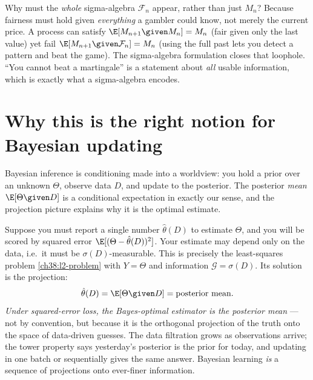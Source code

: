 \begin{happeningbox}
Why must the \emph{whole} sigma-algebra $\mathcal{F}_n$ appear, rather than just $M_n$? Because
fairness must hold given \emph{everything} a gambler could know, not merely the current price.
A process can satisfy $\E[M_{n+1}\given M_n] = M_n$ (fair given only the last value) yet fail
$\E[M_{n+1}\given\mathcal{F}_n] = M_n$ (using the full past lets you detect a pattern and beat the
game). The sigma-algebra formulation closes that loophole. ``You cannot beat a martingale'' is a
statement about \emph{all} usable information, which is exactly what a sigma-algebra encodes.
\end{happeningbox}

\section{Why this is the right notion for Bayesian updating}
\label{ch38:bayes}

Bayesian inference is conditioning made into a worldview: you hold a prior over an unknown $\Theta$,
observe data $D$, and update to the posterior. The posterior \emph{mean} $\E[\Theta \given D]$ is a
conditional expectation in exactly our sense, and the projection picture explains why it is the
optimal estimate.

\begin{applicationbox}
Suppose you must report a single number $\hat\theta(D)$ to estimate $\Theta$, and you will be scored
by squared error $\E[(\Theta - \hat\theta(D))^2]$. Your estimate may depend only on the data, i.e.\ it
must be $\sigma(D)$-measurable. This is precisely the least-squares problem
\eqref{ch38:l2-problem} with $Y = \Theta$ and information $\mathcal{G} = \sigma(D)$. Its solution is
the projection:
\[
  \hat\theta(D) = \E[\Theta \given D] = \text{posterior mean}.
\]
\emph{Under squared-error loss, the Bayes-optimal estimator is the posterior mean} --- not by
convention, but because it is the orthogonal projection of the truth onto the space of data-driven
guesses. The data filtration grows as observations arrive; the tower property says yesterday's
posterior is the prior for today, and updating in one batch or sequentially gives the same answer.
Bayesian learning \emph{is} a sequence of projections onto ever-finer information.
\end{applicationbox}

